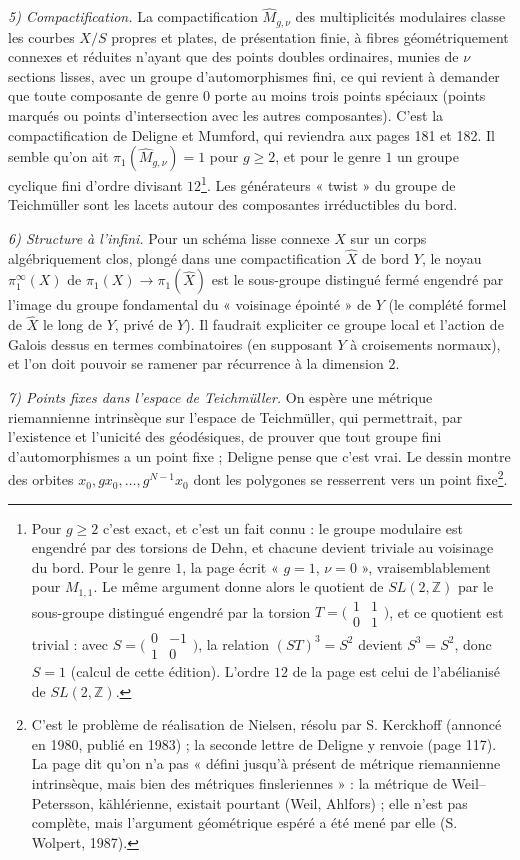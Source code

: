 \documentclass[11pt,a4paper]{article}
\begin{document}
\emph{5) Compactification.} La compactification $\widehat{M}_{g,\nu}$ des
multiplicités modulaires classe les courbes $X/S$ propres et plates, de
présentation finie, à fibres géométriquement connexes et réduites n'ayant
que des points doubles ordinaires, munies de $\nu$ sections lisses, avec un
groupe d'automorphismes fini, ce qui revient à demander que toute composante
de genre $0$ porte au moins trois points spéciaux (points marqués ou points
d'intersection avec les autres composantes). C'est la compactification de
Deligne et Mumford, qui reviendra aux pages 181 et 182. Il semble qu'on ait
$\pi_1(\widehat{M}_{g,\nu}) = 1$ pour $g \geq 2$, et pour le genre $1$ un
groupe cyclique fini d'ordre divisant $12$\footnote{Pour $g \geq 2$ c'est
exact, et c'est un fait connu : le groupe modulaire est engendré par des
torsions de Dehn, et chacune devient triviale au voisinage du bord. Pour le
genre $1$, la page écrit « $g = 1$, $\nu = 0$ », vraisemblablement pour
$M_{1,1}$. Le même argument donne alors le quotient de $SL(2, \mathbb{Z})$ par
le sous-groupe distingué engendré par la torsion
$T = \bigl(\begin{smallmatrix} 1 & 1 \\ 0 & 1 \end{smallmatrix}\bigr)$, et ce
quotient est trivial : avec $S = \bigl(\begin{smallmatrix} 0 & -1 \\ 1 & 0 \end{smallmatrix}\bigr)$,
la relation $(ST)^3 = S^2$ devient $S^3 = S^2$, donc $S = 1$ (calcul de cette
édition). L'ordre $12$ de la page est celui de l'abélianisé de
$SL(2, \mathbb{Z})$.}. Les générateurs « twist » du groupe de Teichmüller sont
les lacets autour des composantes irréductibles du bord.

\emph{6) Structure à l'infini.} Pour un schéma lisse connexe $X$ sur un corps
algébriquement clos, plongé dans une compactification $\widehat{X}$ de bord
$Y$, le noyau $\pi_1^{\infty}(X)$ de $\pi_1(X) \to \pi_1(\widehat{X})$ est le
sous-groupe distingué fermé engendré par l'image du groupe fondamental du
« voisinage épointé » de $Y$ (le complété formel de $\widehat{X}$ le long de
$Y$, privé de $Y$). Il faudrait expliciter ce groupe local et l'action de
Galois dessus en termes combinatoires (en supposant $Y$ à croisements
normaux), et l'on doit pouvoir se ramener par récurrence à la dimension $2$.

\emph{7) Points fixes dans l'espace de Teichmüller.} On espère une métrique
riemannienne intrinsèque sur l'espace de Teichmüller, qui permettrait, par
l'existence et l'unicité des géodésiques, de prouver que tout groupe fini
d'automorphismes a un point fixe ; Deligne pense que c'est vrai. Le dessin
montre des orbites $x_0, gx_0, \ldots, g^{N-1}x_0$ dont les polygones se
resserrent vers un point fixe\footnote{C'est le problème de réalisation de
Nielsen, résolu par S. Kerckhoff (annoncé en 1980, publié en 1983) ; la seconde
lettre de Deligne y renvoie (page 117). La page dit qu'on n'a pas « défini
jusqu'à présent de métrique riemannienne intrinsèque, mais bien des métriques
finsleriennes » : la métrique de Weil–Petersson, kählérienne, existait
pourtant (Weil, Ahlfors) ; elle n'est pas complète, mais l'argument géométrique
espéré a été mené par elle (S. Wolpert, 1987).}.
\end{document}
